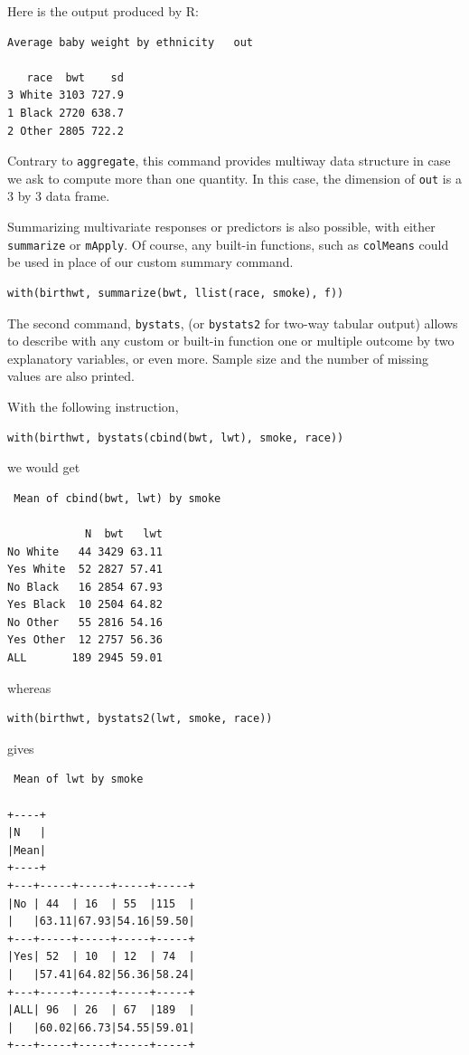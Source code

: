 \documentclass[a4paper,twoside]{book}
\renewcommand{\texttt}[1]{\lstinline{#1}}
\begin{document}
Here is the output produced by R:
\begin{verbatim}
Average baby weight by ethnicity   out

   race  bwt    sd
3 White 3103 727.9
1 Black 2720 638.7
2 Other 2805 722.2
\end{verbatim}

Contrary to \texttt{aggregate}, this command provides multiway data
structure in case we ask to compute more than one quantity. In this case,
the dimension of \texttt{out} is a 3 by 3 data frame.

Summarizing multivariate responses or predictors is also possible, with either \texttt{summarize} or \texttt{mApply}. Of course, any built-in functions, such as \texttt{colMeans} could be used in place of our custom summary command.

\begin{verbatim}
with(birthwt, summarize(bwt, llist(race, smoke), f))
\end{verbatim}

The second command, \texttt{bystats}, (or \texttt{bystats2} for two-way
tabular output) allows to describe with any custom or built-in function one
or multiple outcome by two explanatory variables, or even more. Sample size
and the number of missing values are also printed. 

With the following instruction,
\begin{verbatim}
with(birthwt, bystats(cbind(bwt, lwt), smoke, race))
\end{verbatim}
we would get
\begin{verbatim}
 Mean of cbind(bwt, lwt) by smoke 

            N  bwt   lwt
No White   44 3429 63.11
Yes White  52 2827 57.41
No Black   16 2854 67.93
Yes Black  10 2504 64.82
No Other   55 2816 54.16
Yes Other  12 2757 56.36
ALL       189 2945 59.01
\end{verbatim}
whereas
\begin{verbatim}
with(birthwt, bystats2(lwt, smoke, race))
\end{verbatim}
gives
\begin{verbatim}
 Mean of lwt by smoke 

+----+
|N   |
|Mean|
+----+
+---+-----+-----+-----+-----+
|No | 44  | 16  | 55  |115  |
|   |63.11|67.93|54.16|59.50|
+---+-----+-----+-----+-----+
|Yes| 52  | 10  | 12  | 74  |
|   |57.41|64.82|56.36|58.24|
+---+-----+-----+-----+-----+
|ALL| 96  | 26  | 67  |189  |
|   |60.02|66.73|54.55|59.01|
+---+-----+-----+-----+-----+
\end{verbatim}
\end{document}
